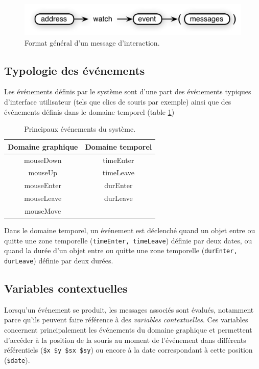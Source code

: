 \documentclass{article}
\newcommand{\code}[1]		{\texttt{\small #1}}
\begin{document}
\begin{figure}[htbp]
\centerline{
	\includegraphics[width=0.95\columnwidth]{imgs/watch}}
\caption{Format général d'un message d'interaction.}
\label{fig:watch}
\end{figure}


\subsection{Typologie des événements}\label{subsec:typologie}

Les événements définis par le système sont d'une part des événements typiques d'interface utilisateur (tels que clics de souris par exemple) ainsi que des événements définis dans le domaine temporel (table \ref{tbl:evts})

\begin{table}[htdp]
\begin{center}
\begin{tabular}{c|c}
Domaine graphique & Domaine temporel \\
\hline
mouseDown 		& timeEnter	\\
mouseUp			& timeLeave	\\
mouseEnter		& durEnter		\\
mouseLeave		& durLeave		\\
mouseMove		&				\\
\end{tabular}
\end{center}
\caption{Principaux événements du système.}
\label{tbl:evts}
\end{table}%

Dans le domaine temporel, un événement est déclenché quand un objet entre ou quitte une zone temporelle (\code{timeEnter, timeLeave}) définie par deux dates, ou quand la durée d'un objet entre ou quitte une zone temporelle (\code{durEnter, durLeave}) définie par deux durées.


\subsection{Variables contextuelles}
Lorsqu'un événement se produit, les messages associés sont évalués, notamment parce qu'ils peuvent faire référence à des \emph{variables contextuelles}. Ces variables concernent principalement les événements du domaine graphique et permettent d'accéder à la position de la souris au moment de l'événement dans différents référentiels (\code{\$x \$y \$sx \$sy}) ou encore à la date correspondant à cette position (\code{\$date}).
\end{document}
